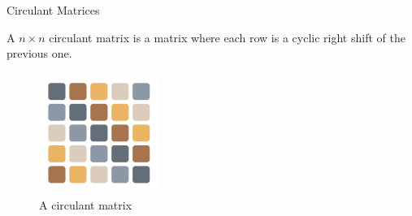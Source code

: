 \begin{frame}{Circulant Matrices}

  A $n \times n$ circulant matrix is a matrix where each row is a cyclic right shift of the previous one. 

  
  
  \begin{figure}
    \centering
    \includegraphics[width=0.35\textwidth]{images/circulant_v1.pdf}
    \caption*{A circulant matrix}
  \end{figure}

\end{frame}


